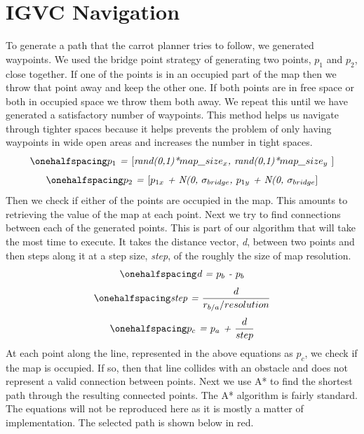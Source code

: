 \documentclass[12pt]{article}
\begin{document}
\newpage
\singlespacing
\section{IGVC Navigation}
\setlength{\parindent}{1cm}

To generate a path that the carrot planner tries to follow, we generated waypoints. We used the bridge point strategy of generating two points, \textit{$p_1$} and \textit{$p_2$}, close together. If one of the points is in an occupied part of the map then we throw that point away and keep the other one. If both points are in free space or both in occupied space we throw them both away. We repeat this until we have generated a satisfactory number of waypoints. This method helps us navigate through tighter spaces because it helps prevents the problem of only having waypoints in wide open areas and increases the number in tight spaces. 
\begin{equation}
\onehalfspacing
\centering
\emph{$p_1$ = \textnormal{\lbrack}rand(0,1)*$map\_size_x$, rand(0,1)*$map\_size_y$ \textnormal{\rbrack}}
\end{equation}
\begin{equation}
\onehalfspacing
\centering
\emph{$p_2$ = \textnormal{\lbrack}$p_{1x}$ + N(0, $\sigma_{bridge}$, $p_{1y}$ + N(0, $\sigma_{bridge}$\textnormal{\rbrack}}
\end{equation}
Then we check if either of the points are occupied in the map. This amounts to retrieving the value of the map at each point. Next we try to find connections between each of the generated points. This is part of our algorithm that will take the most time to execute. It takes the distance vector, \textit{d}, between two points and then steps along it at a step size, \textit{step}, of the roughly the size of map resolution.
\begin{equation}
\onehalfspacing
\centering
\emph{d = $p_b$ - $p_b$}
\end{equation} 
\begin{equation}
\onehalfspacing
\centering
\emph{step = $\frac{d}{r_{b/a}/resolution}$}
\end{equation} 
\begin{equation}
\onehalfspacing
\centering
\emph{$p_c$ = $p_a$ + $\frac{d}{step}$}
\end{equation} 
At each point along the line, represented in the above equations as \textit{$p_c$}, we check if the map is occupied. If so, then that line collides with an obstacle and does not represent a valid connection between points. Next we use A* to find the shortest path through the resulting connected points. The A* algorithm is fairly standard. The equations will not be reproduced here as it is mostly a matter of implementation. The selected path is shown below in red.
\end{document}
